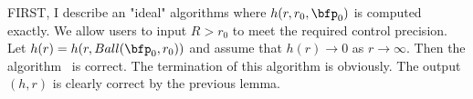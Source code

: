{%
		FIRST, I describe an "ideal" algorithms where $h(r,r_0,\bfp_0)$ is
	computed exactly.
	We allow users to input $ R>r_0 $ to meet the required control precision.
	\Ldent{}%
	\blem
		Let $h(r)= h(r,Ball(\bfp_0,r_0))$ and assume that
		$h(r)\to 0$ as $r\to\infty$. 
		Then the algorithm \estimateR\ is correct.
	\elem
	\bpf
	The termination of this algorithm is obviously. 
	 The output $(h,r)$ is clearly
		correct by the previous lemma.
	\epf
}%
	
	
%	
%	
%	
%	
	
